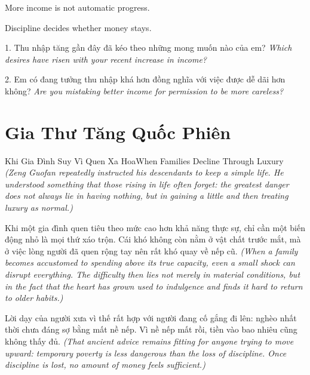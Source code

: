 \begin{ghinhoanh}
More income is not automatic progress.

Discipline decides whether money stays.
\end{ghinhoanh}

\begin{tuhocnhanh}
1. Thu nhập tăng gần đây đã kéo theo những mong muốn nào của em? \textit{Which desires have risen with your recent increase in income?}

2. Em có đang tưởng thu nhập khá hơn đồng nghĩa với việc được dễ dãi hơn không? \textit{Are you mistaking better income for permission to be more careless?}
\end{tuhocnhanh}
\ngancach

\section{Gia Thư Tăng Quốc Phiên}
\begin{truyen}{Khi Gia Đình Suy Vì Quen Xa Hoa}{When Families Decline Through Luxury}
\textit{(Zeng Guofan repeatedly instructed his descendants to keep a simple life. He understood something that those rising in life often forget: the greatest danger does not always lie in having nothing, but in gaining a little and then treating luxury as normal.)}

Khi một gia đình quen tiêu theo mức cao hơn khả năng thực sự, chỉ cần một biến động nhỏ là mọi thứ xáo trộn. Cái khó không còn nằm ở vật chất trước mắt, mà ở việc lòng người đã quen rộng tay nên rất khó quay về nếp cũ.
\textit{(When a family becomes accustomed to spending above its true capacity, even a small shock can disrupt everything. The difficulty then lies not merely in material conditions, but in the fact that the heart has grown used to indulgence and finds it hard to return to older habits.)}

Lời dạy của người xưa vì thế rất hợp với người đang cố gắng đi lên: nghèo nhất thời chưa đáng sợ bằng mất nề nếp. Vì nề nếp mất rồi, tiền vào bao nhiêu cũng không thấy đủ.
\textit{(That ancient advice remains fitting for anyone trying to move upward: temporary poverty is less dangerous than the loss of discipline. Once discipline is lost, no amount of money feels sufficient.)}
\end{truyen}

